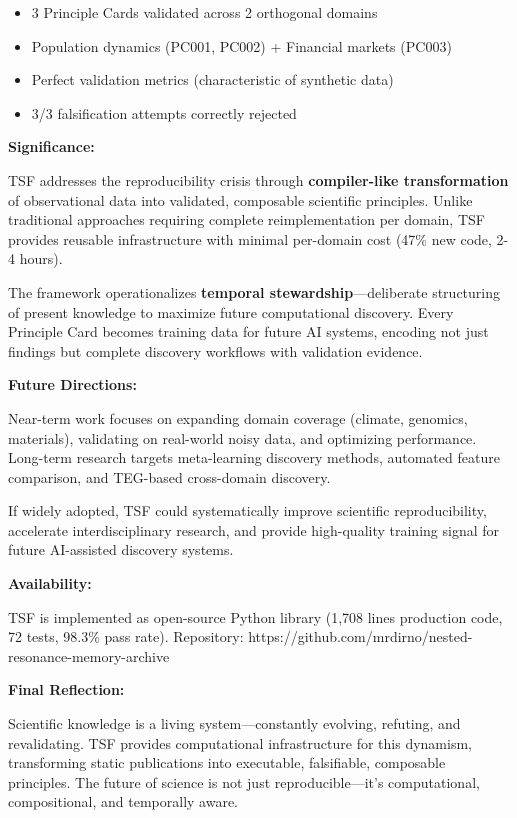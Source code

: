 \documentclass[
]{article}
\providecommand{\tightlist}{%
  \setlength{\itemsep}{0pt}\setlength{\parskip}{0pt}}
\begin{document}
\begin{enumerate}
  \begin{itemize}
  \tightlist
  \item
    3 Principle Cards validated across 2 orthogonal domains
  \item
    Population dynamics (PC001, PC002) + Financial markets (PC003)
  \item
    Perfect validation metrics (characteristic of synthetic data)
  \item
    3/3 falsification attempts correctly rejected
  \end{itemize}
\end{enumerate}

\textbf{Significance:}

TSF addresses the reproducibility crisis through \textbf{compiler-like
transformation} of observational data into validated, composable
scientific principles. Unlike traditional approaches requiring complete
reimplementation per domain, TSF provides reusable infrastructure with
minimal per-domain cost (47\% new code, 2-4 hours).

The framework operationalizes \textbf{temporal stewardship}---deliberate
structuring of present knowledge to maximize future computational
discovery. Every Principle Card becomes training data for future AI
systems, encoding not just findings but complete discovery workflows
with validation evidence.

\textbf{Future Directions:}

Near-term work focuses on expanding domain coverage (climate, genomics,
materials), validating on real-world noisy data, and optimizing
performance. Long-term research targets meta-learning discovery methods,
automated feature comparison, and TEG-based cross-domain discovery.

If widely adopted, TSF could systematically improve scientific
reproducibility, accelerate interdisciplinary research, and provide
high-quality training signal for future AI-assisted discovery systems.

\textbf{Availability:}

TSF is implemented as open-source Python library (1,708 lines production
code, 72 tests, 98.3\% pass rate). Repository:
https://github.com/mrdirno/nested-resonance-memory-archive

\textbf{Final Reflection:}

Scientific knowledge is a living system---constantly evolving, refuting,
and revalidating. TSF provides computational infrastructure for this
dynamism, transforming static publications into executable, falsifiable,
composable principles. The future of science is not just
reproducible---it's computational, compositional, and temporally aware.
\end{document}

